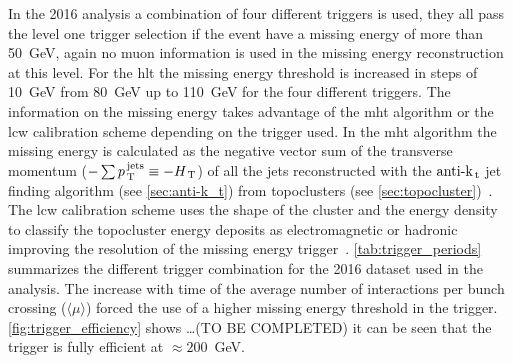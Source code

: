 In the 2016 analysis a combination of four different triggers is used, they all
pass the level one trigger selection if the event have a missing energy of more
than 50~GeV, again no muon information is used in the missing energy
reconstruction at this level. For the \gls{hlt} the missing energy threshold is
increased in steps of 10~GeV from 80~GeV up to 110~GeV for the four different
triggers. The information on the missing energy takes advantage of the \gls{mht}
algorithm or the \gls{lcw} calibration scheme depending on the trigger used. In
the \gls{mht} algorithm the missing energy is calculated as the negative vector
sum of the transverse momentum
($- \sum p_\mathrm{\, T}^\mathrm{\, jets} \equiv - H_\mathrm{\, T}$) of all the jets
reconstructed with the $\text{anti-k}_\mathrm{\, t}$ jet finding algorithm (see \cref{sec:anti-k_t})
from topoclusters (see \cref{sec:topocluster})~\cite{MHTAlgorithm}. The
\gls{lcw} calibration scheme uses the shape of the cluster and the energy
density to classify the topocluster energy deposits as electromagnetic or
hadronic improving the resolution of the missing energy
trigger~\cite{LCWCalibration}. \cref{tab:trigger_periods} summarizes the
different trigger combination for the 2016 dataset used in the analysis. The
increase with time of the average number of interactions per bunch crossing
($\langle \mu \rangle$) forced the use of a higher missing energy threshold in
the trigger. \cref{fig:trigger_efficiency} shows \dots (TO BE COMPLETED) it can
be seen that the trigger is fully efficient at $\approx 200$~GeV.
